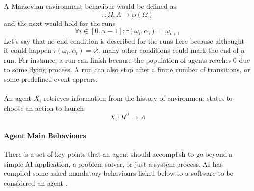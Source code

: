 \documentclass[11pt,oneside,a4paper,openright]{report}
\begin{document}
A Markovian environment behaviour would be defined as
\begin{equation}
	\tau : \Omega,A \longrightarrow \wp(\Omega)
\end{equation}
and the next would hold for the runs
\begin{equation} 
	\forall i \in [0..u-1] : \tau(\omega_i, \alpha_i) = \omega_{i+1}
\end{equation}
Let's say that no end condition is described for the runs here because althought it could happen
$\tau(\omega_i, \alpha_i) = \varnothing$, many other conditions could mark the end of a run.
For instance, a run can finish because the population of agents reaches 0 due to some dying process.
A run can also stop after a finite number of transitions, or some predefined event appears.\\
\\
An agent $X_i$ retrieves information from the history of environment states to choose an action to launch
\begin{equation}
	X_i : R^{\Omega} \longrightarrow A 
\end{equation}


\paragraph{Agent Main Behaviours}

There is a set of key points that an agent should accomplish to go beyond a simple AI application, a problem solver, or just a system process. AI has compiled some asked mandatory behaviours lisked below to a software to be considered an agent \cite[ch.2]{Wooldridge2002}\cite[ch.1, ch.2]{RussellNorvig}. 
\end{document}
